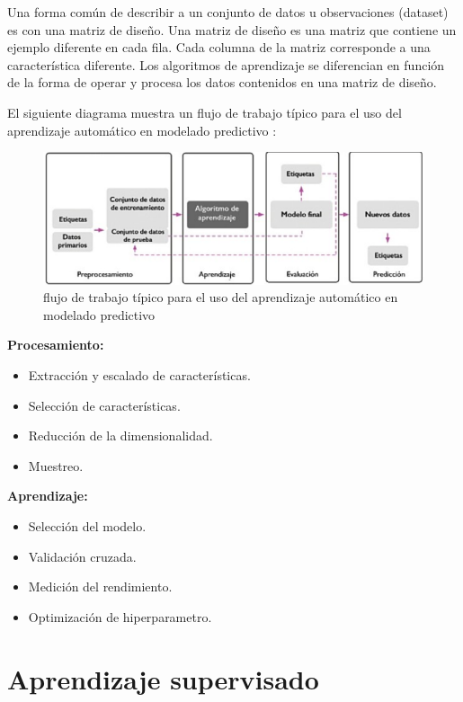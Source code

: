 Una forma común de describir a un conjunto de datos u observaciones (dataset) es con una matriz de diseño. Una matriz de diseño es una matriz que contiene un ejemplo diferente en cada fila. Cada columna de la matriz corresponde a una característica diferente. Los algoritmos de aprendizaje se diferencian en función de la forma de operar y procesa los datos contenidos en una matriz de diseño\cite{arana2021redes}.

El siguiente diagrama muestra un flujo de trabajo típico para el uso del aprendizaje automático en modelado predictivo \cite{mirjalili2020python}:

\begin{figure}[H]
  \begin{center}
    \includegraphics[scale=0.80]{./uso_aprendisaje_automatico.png}
    \caption{ flujo de trabajo típico para el uso del aprendizaje automático en modelado predictivo}
    \label{fig:perceptron}
  \end{center}
\end{figure}

\textbf{Procesamiento:}
  \begin{itemize}
    \item Extracción y escalado de características.
    \item Selección de características.
    \item Reducción de la dimensionalidad.
    \item Muestreo.
  \end{itemize}
\textbf{Aprendizaje:}%
  \begin{itemize}
    \item Selección del modelo.
    \item Validación cruzada.
    \item Medición del rendimiento.
    \item Optimización de hiperparametro.
  \end{itemize}

\section{Aprendizaje supervisado}

